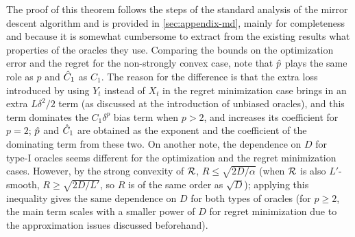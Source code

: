 The proof of this theorem follows the steps of the standard analysis of the mirror descent algorithm
 and is provided in \cref{sec:appendix-md}, mainly for completeness 
 and because it is somewhat cumbersome to extract from the existing results what properties of the oracles they use.
 Comparing the bounds on the optimization error and the regret for the non-strongly convex case, note that $\hat{p}$ plays the same role as $p$ and $\hat{C}_1$ as $C_1$. The reason for the difference is that the extra loss introduced by using $Y_t$ instead of $X_t$ in the regret minimization case brings in an extra $L \delta^2/2$ term (as discussed at the introduction of unbiased oracles), and this term dominates the $C_1 \delta^p$ bias term when $p>2$, and increases its coefficient for $p=2$; $\hat{p}$ and $\hat{C}_1$ are obtained as the exponent and the coefficient of the dominating term from these two. On another note, the dependence on $D$ for type-I oracles seems different for the optimization and the regret minimization cases. However, by the strong convexity of $\mathcal{R}$, $R \le \sqrt{2 D/\alpha}$ (when $\mathcal{R}$ is also $L'$-smooth, $R \ge \sqrt{2 D/L'}$, so $R$ is of the same order as $\sqrt{D}$); applying this inequality gives the same dependence on $D$ for both types of oracles (for $p\ge 2$, the main term scales with a smaller power of $D$ for regret minimization due to the approximation issues discussed beforehand).
 
